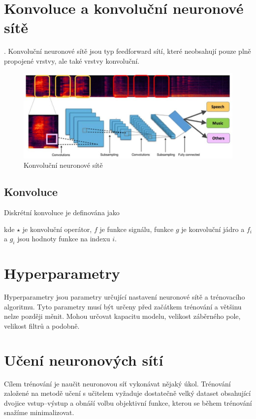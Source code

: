 \section{Konvoluce a konvoluční neuronové sítě}
.
Konvoluční neuronové sítě jsou typ feedforward sítí, které neobsahují pouze plně propojené vrstvy, ale také vrstvy konvoluční.
\begin{figure}[H]
    \centering
    \includegraphics[scale=0.5]{obrazky-figures/conv_nn_audio.jpg}
    \caption{\label{fig:conv_nn}Konvoluční neuronové sítě}
\end{figure}

\subsection{Konvoluce}
Diskrétní konvoluce je definována jako


kde $\star$ je konvoluční operátor, $f$ je funkce signálu, funkce $g$ je konvoluční jádro a $f_i$ a $g_i$ jsou hodnoty funkce na indexu $i$.




\section{Hyperparametry}
Hyperparametry jsou parametry určující nastavení neuronové sítě a trénovacího algoritmu. Tyto parametry musí být určeny před začátkem trénování a většinu nelze později měnit. Mohou určovat kapacitu modelu, velikost záběrného pole, velikost filtrů a podobně.




\section{Učení neuronových sítí}
Cílem trénování je naučit neuronovou síť vykonávat nějaký úkol. Trénování založené na metodě učení s učitelem vyžaduje dostatečně velký dataset obsahující dvojice vstup--výstup a obnáší volbu objektivní funkce, kterou se během trénování snažíme minimalizovat. 


